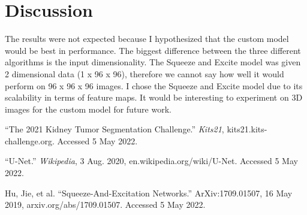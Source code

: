 \documentclass [12pt, letterpaper] {article}
\begin{document}
\section{Discussion}
The results were not expected because I hypothesized that the custom model would be best in performance. The biggest difference between the three different algorithms is the input dimensionality. The Squeeze and Excite model was given 2 dimensional data (1 x 96 x 96), therefore we cannot say how well it would perform on 96 x 96 x 96 images. I chose the Squeeze and Excite model due to its scalability in terms of feature maps. It would be interesting to experiment on 3D images for the custom model for future work. 


\begin{thebibliography}{2}
“The 2021 Kidney Tumor Segmentation Challenge.” \emph{Kits21}, kits21.kits-challenge.org. Accessed 5 May 2022.

“U-Net.” \emph{Wikipedia}, 3 Aug. 2020, en.wikipedia.org/wiki/U-Net. Accessed 5 May 2022.

Hu, Jie, et al. “Squeeze-And-Excitation Networks.” ArXiv:1709.01507, 16 May 2019, arxiv.org/abs/1709.01507. Accessed 5 May 2022.
\end{thebibliography}
\end{document}
